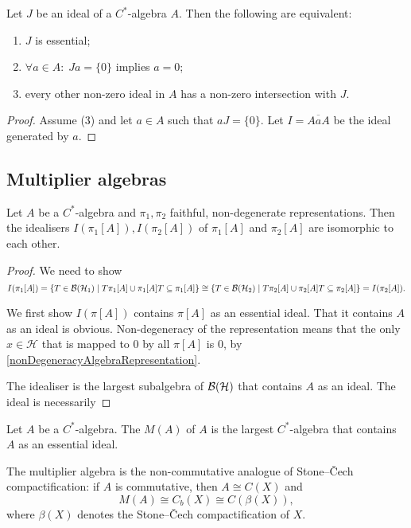 \begin{proposition}
Let $J$ be an ideal of a $C^*$-algebra $A$. Then the following are equivalent:
\begin{enumerate}
\item $J$ is essential;
\item $\forall a\in A:\;Ja = \{0\}$ implies $a=0$;
\item every other non-zero ideal in $A$ has a non-zero intersection with $J$.
\end{enumerate}
\end{proposition}
\begin{proof}
Assume (3) and let $a\in A$ such that $aJ=\{0\}$. Let $I= \overline{AaA}$ be the ideal generated by $a$.
\end{proof}

\subsection{Multiplier algebras}
\begin{proposition}
Let $A$ be a $C^*$-algebra and $\pi_1, \pi_2$ faithful, non-degenerate representations. Then the idealisers $I(\pi_1[A]), I(\pi_2[A])$ of $\pi_1[A]$ and $\pi_2[A]$ are isomorphic to each other.
\end{proposition}
\begin{proof}
We need to show
\[ I(\pi_1[A]) = \setbuilder{T\in \Bounded(\mathcal{H}_1)}{T\pi_1[A] \cup \pi_1[A]T \subseteq \pi_1[A]} \cong \setbuilder{T\in \Bounded(\mathcal{H}_2)}{T\pi_2[A] \cup \pi_2[A]T \subseteq \pi_2[A]} = I(\pi_2[A]). \]

We first show $I(\pi[A])$ contains $\pi[A]$ as an essential ideal. That it contains $A$ as an ideal is obvious. Non-degeneracy of the representation means that the only $x\in\mathcal{H}$ that is mapped to $0$ by all $\pi[A]$ is $0$, by \ref{nonDegeneracyAlgebraRepresentation}. 

The idealiser is the largest subalgebra of $\operatorname{\mathcal{B}}(\mathcal{H})$ that contains $A$ as an ideal. The ideal is necessarily 
\end{proof}

\begin{definition}
Let $A$ be a $C^*$-algebra. The  $M(A)$ of $A$ is the largest $C^*$-algebra that contains $A$ as an essential ideal.
\end{definition}

The multiplier algebra is the non-commutative analogue of Stone–Čech compactification: if $A$ is commutative, then $A\cong C(X)$ and
\[ M(A) \cong C_b(X) \cong C(\beta(X)), \]
where $\beta(X)$ denotes the Stone–Čech compactification of $X$.

